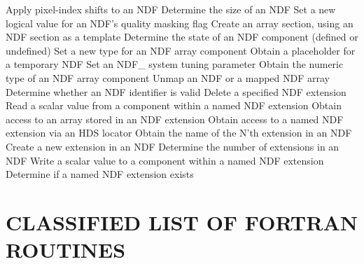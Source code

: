 \begin{latexonly}
            {Apply pixel-index shifts to an NDF}
            {Determine the size of an NDF}
            {Set a new logical value for an NDF's quality masking flag}
            {Create an array section, using an NDF section as a template}
            {Determine the state of an NDF component (defined or undefined)}
            {Set a new type for an NDF array component}
            {Obtain a placeholder for a temporary NDF}
            {Set an NDF\_ system tuning parameter}
            {Obtain the numeric type of an NDF array component}
            {Unmap an NDF or a mapped NDF array}
            {Determine whether an NDF identifier is valid}
            {Delete a specified NDF extension}
            {Read a scalar value from a component within a named NDF extension}
            {Obtain access to an array stored in an NDF extension}
            {Obtain access to a named NDF extension via an HDS locator}
            {Obtain the name of the N'th extension in an NDF}
            {Create a new extension in an NDF}
            {Determine the number of extensions in an NDF}
            {Write a scalar value to a component within a named NDF extension}
            {Determine if a named NDF extension exists}
\normalsize
\end{latexonly}

\newpage
\section{CLASSIFIED LIST OF FORTRAN ROUTINES}

